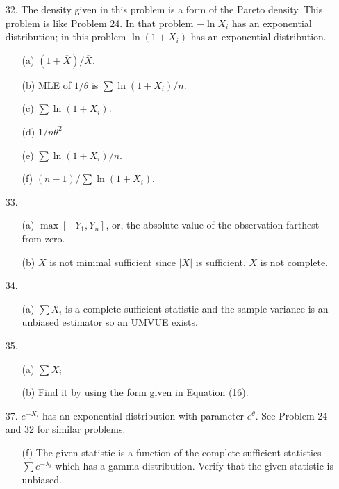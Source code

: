 \begin{enumerate}
	\item[32.] The density given in this problem is a form of the Pareto density.  This problem is like Problem 24.  In that problem $-\ln X_i$ has an exponential distribution; in this problem $\ln(1+X_i)$ has an exponential distribution.
	\begin{enumerate}
		\item[(a)] $(1+\overline{X})/\overline{X}$.
		\item[(b)] MLE of $1/\theta$ is $\sum \ln(1+X_i)/n$.
		\item[(c)] $\sum \ln(1+X_i)$.
		\item[(d)] $1/n\theta^2$
		\item[(e)] $\sum \ln(1+X_i)/n$.
		\item[(f)] $(n-1)/\sum \ln(1+X_i)$.
	\end{enumerate}
	
	\item[33.] \begin{enumerate}
		\item[(a)] $\max[-Y_1,Y_n]$, or, the absolute value of the observation farthest from zero.
		\item[(b)] $X$ is not minimal sufficient since $\vert X\vert$ is sufficient. $X$ is not complete.
	\end{enumerate}  
	  
	\item[34.] \begin{enumerate}
		\item[(a)] $\sum X_i$ is a complete sufficient statistic and the sample variance is an unbiased estimator so an UMVUE exists.
		\end{enumerate}	  
	  
	\item[35.] \begin{enumerate}
		\item[(a)] $\sum X_i$
		\item[(b)] Find it by using the form given in Equation (16).
	\end{enumerate}
	  
	\item[37.] $e^{-X_i}$ has an exponential distribution with parameter $e^\theta$.  See Problem 24 and 32 for similar problems.  
	\begin{enumerate}
		\item[(f)] The given statistic is a function of the complete sufficient statistics $\sum e^{-\lambda_i}$ which has a gamma distribution.  Verify that the given statistic is unbiased. 
	\end{enumerate}
	 

\end{enumerate}
